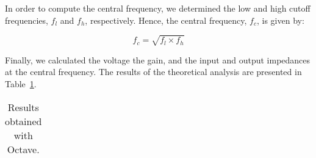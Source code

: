 \vspace{4mm}

In order to compute the central frequency, we determined the low and high cutoff frequencies, $f_l$ and $f_h$, respectively. Hence, the central frequency, $f_c$, is given by:

\begin{equation}
f_c=\sqrt{f_l\times f_h}
\end{equation}

Finally, we calculated the voltage the gain, and the input and output impedances at the central frequency. The results of the theoretical analysis are presented in Table~\ref{tab:resultsteo}.

\begin{table}[H]
  \centering
  \begin{tabular}{|l|r|}
    \hline    
  \end{tabular}
  \caption{Results obtained with Octave.}
  \label{tab:resultsteo}
\end{table}

